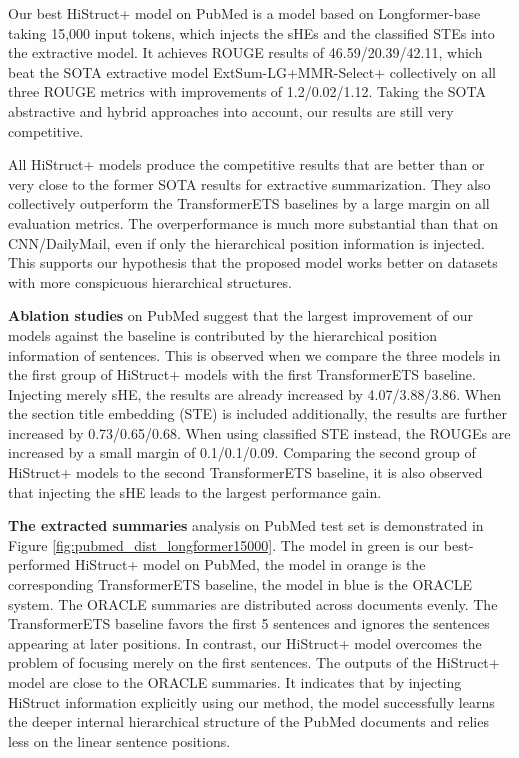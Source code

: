 \documentclass[11pt]{article}
\begin{document}
Our best HiStruct+ model on PubMed is a model based on Longformer-base taking 15,000 input tokens, which injects the sHEs and the classified STEs into the extractive model. It achieves ROUGE results of 46.59/20.39/42.11, which beat the SOTA extractive model ExtSum-LG+MMR-Select+ collectively on all three ROUGE metrics with improvements of 1.2/0.02/1.12. Taking the SOTA abstractive and hybrid approaches into account, our results are still very competitive. 


All HiStruct+ models produce the competitive results that are better than or very close to the former SOTA results for extractive summarization. They also collectively outperform the TransformerETS baselines by a large margin on all evaluation metrics. The overperformance is much more substantial than that on CNN/DailyMail, even if only the hierarchical position information is injected. 
This supports our hypothesis that the proposed model works better on datasets with more conspicuous hierarchical
structures.



\textbf{Ablation studies} on PubMed suggest that the largest improvement of our models against the baseline is contributed by the hierarchical position information of sentences. This is observed when we compare the three models in the first group of HiStruct+ models with the first TransformerETS baseline. Injecting merely sHE, the results are already increased by 4.07/3.88/3.86. When the section title embedding (STE) is included additionally, the results are further increased by 0.73/0.65/0.68. When using classified STE instead, the ROUGEs are increased by a small margin of 0.1/0.1/0.09. Comparing the second group of HiStruct+ models to the second TransformerETS baseline, it is also observed that injecting the sHE leads to the largest performance gain.

\textbf{The extracted summaries} analysis on PubMed test set is demonstrated in Figure \ref{fig:pubmed_dist_longformer15000}. The model in green is our best-performed HiStruct+ model on PubMed, the model in orange is the corresponding TransformerETS baseline, the model in blue is the ORACLE system. The ORACLE summaries are distributed across documents evenly. The TransformerETS baseline favors the first 5 sentences and ignores the sentences appearing at later positions. In contrast, our HiStruct+ model overcomes the problem of focusing merely on the first sentences. The outputs of the HiStruct+ model are close to the ORACLE summaries. It indicates that by injecting HiStruct information explicitly using our method, the model successfully learns the deeper internal hierarchical structure of the PubMed documents and relies less on the linear sentence positions.
\end{document}
